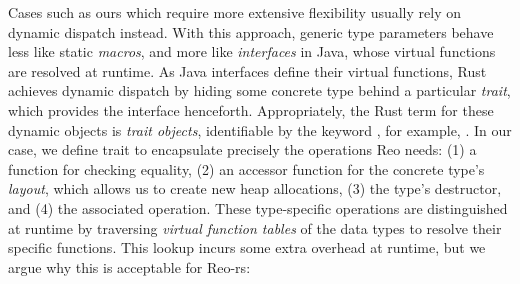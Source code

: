 Cases such as ours which require more extensive flexibility usually rely on dynamic dispatch instead. With this approach, generic type parameters behave less like static \textit{macros}, and more like \textit{interfaces} in Java, whose virtual functions are resolved at runtime. 
As Java interfaces define their virtual functions, Rust achieves dynamic dispatch by hiding some concrete type behind a particular \textit{trait}, which provides the interface henceforth. Appropriately, the Rust term for these dynamic objects is \textit{trait objects}, identifiable by the keyword , for example, . In our case, we define trait  to encapsulate precisely the operations Reo needs: (1) a function for checking equality, (2) an accessor function for the concrete type's \textit{layout}, which allows us to create new heap allocations, (3) the type's destructor, and (4) the associated  operation. These type-specific operations are distinguished at runtime by traversing \textit{virtual function tables} of the data types to resolve their specific functions. This lookup incurs some extra overhead at runtime, but we argue why this is acceptable for Reo-rs:
